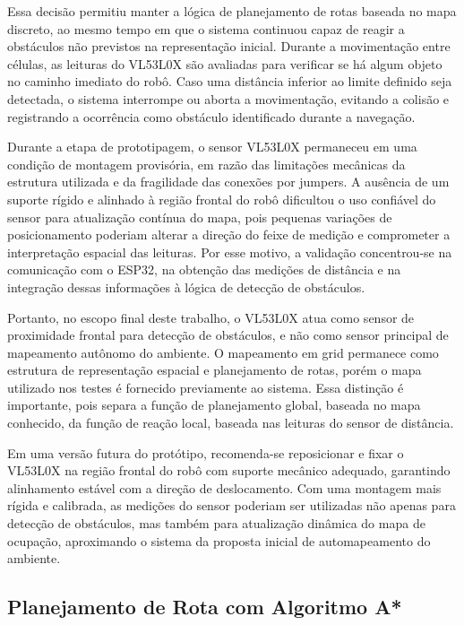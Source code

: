 \documentclass[	12pt, Times, openright, twoside, a4paper, english, brazil]{abntex2}
\begin{document}
Essa decisão permitiu manter a lógica de planejamento de rotas baseada no mapa discreto, ao mesmo tempo em que o sistema continuou capaz de reagir a obstáculos não previstos na representação inicial. Durante a movimentação entre células, as leituras do VL53L0X são avaliadas para verificar se há algum objeto no caminho imediato do robô. Caso uma distância inferior ao limite definido seja detectada, o sistema interrompe ou aborta a movimentação, evitando a colisão e registrando a ocorrência como obstáculo identificado durante a navegação.

Durante a etapa de prototipagem, o sensor VL53L0X permaneceu em uma condição de montagem provisória, em razão das limitações mecânicas da estrutura utilizada e da fragilidade das conexões por jumpers. A ausência de um suporte rígido e alinhado à região frontal do robô dificultou o uso confiável do sensor para atualização contínua do mapa, pois pequenas variações de posicionamento poderiam alterar a direção do feixe de medição e comprometer a interpretação espacial das leituras. Por esse motivo, a validação concentrou-se na comunicação com o ESP32, na obtenção das medições de distância e na integração dessas informações à lógica de detecção de obstáculos.

Portanto, no escopo final deste trabalho, o VL53L0X atua como sensor de proximidade frontal para detecção de obstáculos, e não como sensor principal de mapeamento autônomo do ambiente. O mapeamento em grid permanece como estrutura de representação espacial e planejamento de rotas, porém o mapa utilizado nos testes é fornecido previamente ao sistema. Essa distinção é importante, pois separa a função de planejamento global, baseada no mapa conhecido, da função de reação local, baseada nas leituras do sensor de distância.

Em uma versão futura do protótipo, recomenda-se reposicionar e fixar o VL53L0X na região frontal do robô com suporte mecânico adequado, garantindo alinhamento estável com a direção de deslocamento. Com uma montagem mais rígida e calibrada, as medições do sensor poderiam ser utilizadas não apenas para detecção de obstáculos, mas também para atualização dinâmica do mapa de ocupação, aproximando o sistema da proposta inicial de automapeamento do ambiente.

\subsection{Planejamento de Rota com Algoritmo A*}
\end{document}
